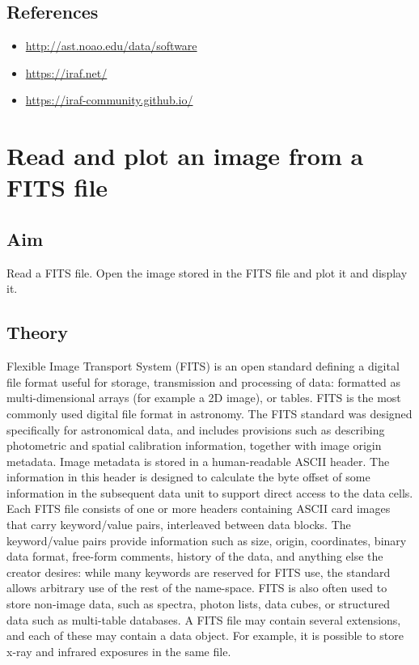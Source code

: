 \documentclass[letterpaper,11pt]{report}
\begin{document}
\section{References}
\begin{itemize}
    \item \href{http://ast.noao.edu/data/software}{http://ast.noao.edu/data/software}
    \item \href{https://iraf.net/}{https://iraf.net/}
    \item \href{https://iraf-community.github.io/}{https://iraf-community.github.io/}
\end{itemize}

\chapter{Read and plot an image from a FITS file}

\section{Aim}
Read a FITS file. Open the image stored in the FITS file and plot it and display it.

\section{Theory}
Flexible Image Transport System (FITS) is an open standard defining a digital file format useful for storage, transmission and processing of data: formatted as multi-dimensional arrays (for example a 2D image), or tables. FITS is the most commonly used digital file format in astronomy. The FITS standard was designed specifically for astronomical data, and includes provisions such as describing photometric and spatial calibration information, together with image origin metadata.
Image metadata is stored in a human-readable ASCII header. The information in this header is designed to calculate the byte offset of some information in the subsequent data unit to support direct access to the data cells. Each FITS file consists of one or more headers containing ASCII card images that carry keyword/value pairs, interleaved between data blocks. The keyword/value pairs provide information such as size, origin, coordinates, binary data format, free-form comments, history of the data, and anything else the creator desires: while many keywords are reserved for FITS use, the standard allows arbitrary use of the rest of the name-space.
FITS is also often used to store non-image data, such as spectra, photon lists, data cubes, or structured data such as multi-table databases. A FITS file may contain several extensions, and each of these may contain a data object. For example, it is possible to store x-ray and infrared exposures in the same file.
\end{document}
